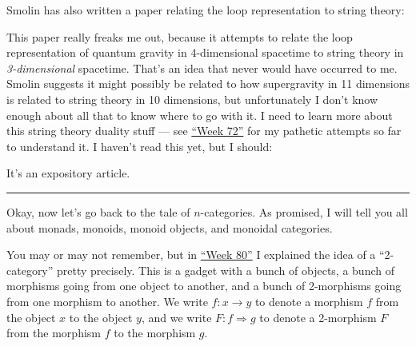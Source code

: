 \documentclass{article}
\def\tightlist{}
\renewcommand{\texttt}[1]{%
  \begingroup
  \ttfamily
  \begingroup\lccode`~=`/\lowercase{\endgroup\def~}{/\discretionary{}{}{}}%
  \begingroup\lccode`~=`[\lowercase{\endgroup\def~}{[\discretionary{}{}{}}%
  \begingroup\lccode`~=`.\lowercase{\endgroup\def~}{.\discretionary{}{}{}}%
  \catcode`/=\active\catcode`[=\active\catcode`.=\active
  \scantokens{#1\noexpand}%
  \endgroup
}
\begin{document}
Smolin has also written a paper relating the loop representation to
string theory:


This paper really freaks me out, because it attempts to relate the loop
representation of quantum gravity in 4-dimensional spacetime to string
theory in \emph{3-dimensional} spacetime. That's an idea that never
would have occurred to me. Smolin suggests it might possibly be related
to how supergravity in 11 dimensions is related to string theory in 10
dimensions, but unfortunately I don't know enough about all that to know
where to go with it. I need to learn more about this string theory
duality stuff --- see \protect\hyperlink{week72}{``Week 72''} for my
pathetic attempts so far to understand it. I haven't read this yet, but
I should:


It's an expository article.

\begin{center}\rule{0.5\linewidth}{0.5pt}\end{center}

Okay, now let's go back to the tale of \(n\)-categories. As promised, I
will tell you all about monads, monoids, monoid objects, and monoidal
categories.

You may or may not remember, but in \protect\hyperlink{week80}{``Week
80''} I explained the idea of a ``2-category'' pretty precisely. This is
a gadget with a bunch of objects, a bunch of morphisms going from one
object to another, and a bunch of 2-morphisms going from one morphism to
another. We write \(f\colon x\to y\) to denote a morphism \(f\) from the
object \(x\) to the object \(y\), and we write
\(F\colon f\Rightarrow g\) to denote a 2-morphism \(F\) from the
morphism \(f\) to the morphism \(g\).
\end{document}

